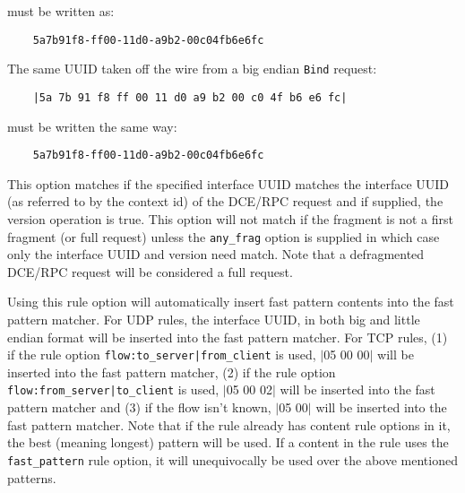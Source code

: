 \documentclass[english]{report}
\newenvironment{note}{
\samepage
    \vspace{10pt}{\textsf{
        {\hspace{7pt}\Huge{$\triangle$\hspace{-12.5pt}{\Large{$^!$}}}}\hspace{5pt}
        {\Large{NOTE}}
    }
    }
   \begin{center}
    \par\vspace{-17pt}

    \begin{lrbox}{\savepar}
    \begin{minipage}[r]{6in}
}
{
    \end{minipage}
    \end{lrbox}
    \fbox{
        \usebox{
            \savepar
	}
    }
    \par\vskip10pt
    \end{center}
}
\newenvironment{note}{
        \begin{rawhtml}
        <p><table border="1"><tr><td><b>
        Note:&nbsp;&nbsp;</b>
        \end{rawhtml}
}{
        \begin{rawhtml}
        </b></td></tr></table></p>
        \end{rawhtml}
}
\begin{document}
\begin{itemize}
must be written as:

\begin{verbatim}
    5a7b91f8-ff00-11d0-a9b2-00c04fb6e6fc
\end{verbatim}

The same UUID taken off the wire from a big endian \texttt{Bind} request:

\begin{verbatim}
    |5a 7b 91 f8 ff 00 11 d0 a9 b2 00 c0 4f b6 e6 fc|
\end{verbatim}

must be written the same way:

\begin{verbatim}
    5a7b91f8-ff00-11d0-a9b2-00c04fb6e6fc
\end{verbatim}

This option matches if the specified interface UUID matches the interface UUID
(as referred to by the context id) of the DCE/RPC request and if supplied, the
version operation is true. This option will not match if the fragment is not a
first fragment (or full request) unless the \texttt{any\_frag} option is
supplied in which case only the interface UUID and version need match.  Note
that a defragmented DCE/RPC request will be considered a full request.

\begin{note}
Using this rule option will automatically insert fast pattern contents into
the fast pattern matcher.  For UDP rules, the interface UUID, in both big and
little endian format will be inserted into the fast pattern matcher.  For TCP
rules, (1) if the rule option \texttt{flow:to\_server|from\_client} is used, $|$05 00 00$|$
will be inserted into the fast pattern matcher, (2) if the rule option
\texttt{flow:from\_server|to\_client} is used, $|$05 00 02$|$ will be inserted into the
fast pattern matcher and (3) if the flow isn't known, $|$05 00$|$ will be inserted
into the fast pattern matcher.  Note that if the rule already has content rule
options in it, the best (meaning longest) pattern will be used.  If a content
in the rule uses the \texttt{fast\_pattern} rule option, it will unequivocally be used
over the above mentioned patterns.
\end{note}

\end{itemize}
\end{document}
